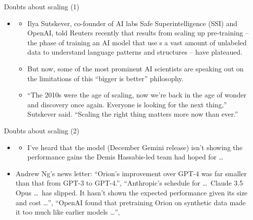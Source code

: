 

\begin{vbframe}{Doubts about scaling (1)}

\vfill

\begin{itemize}
\item {}
\begin{itemize}
\item Ilya Sutskever, co-founder of AI labs Safe Superintelligence
	(SSI) and OpenAI, told Reuters recently that results
	from scaling up pre-training -- the phase of training
	an AI model that use s a vast amount of unlabeled
	data to understand language patterns and structures
	-- have plateaued.
	\item
But now, some of the most prominent AI scientists are
speaking out on the limitations of this “bigger is better”
philosophy.
\item “The 2010s were the age of scaling, now we're back in
	the age of wonder and discovery once again. Everyone
	is looking for the next thing,” Sutskever
	said. “Scaling the right thing matters more now than ever.”
\end{itemize}
\end{itemize}


\vfill

\end{vbframe}


\begin{vbframe}{Doubts about scaling (2)}

\vfill

\begin{itemize}
\item {}
\begin{itemize}
\item I've heard that the model (December Gemini release) isn't showing the
	performance
        gains the Demis Hassabis-led team had hoped for \ldots
\end{itemize}
\item Andrew Ng's news letter:
``Orion’s improvement over GPT-4 was
far smaller than that from GPT-3 to GPT-4.'',
``Anthropic’s schedule for \ldots\ Claude 3.5 Opus \ldots\
has slipped. It
hasn’t shown the expected performance given its size and
cost \ldots'',
``OpenAI found that pretraining Orion on
synthetic data made it too much like earlier models \ldots'',
\end{itemize}


\vfill

\end{vbframe}

